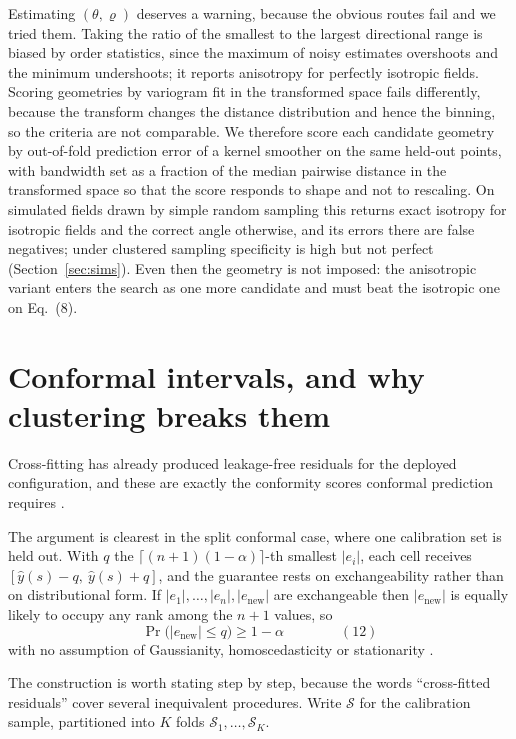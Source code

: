 \documentclass[preprint,12pt,authoryear]{elsarticle}
\newcommand{\eqnum}[1]{\qquad\qquad\mathrm{(#1)}}
\begin{document}
Estimating $(\theta,\varrho)$ deserves a warning, because the obvious routes
fail and we tried them. Taking the ratio of the smallest to the largest
directional range is biased by order statistics, since the maximum of noisy
estimates overshoots and the minimum undershoots; it reports anisotropy for
perfectly isotropic fields. Scoring geometries by variogram fit in the
transformed space fails differently, because the transform changes the distance
distribution and hence the binning, so the criteria are not comparable. We
therefore score each candidate geometry by out-of-fold prediction error of a
kernel smoother on the same held-out points, with bandwidth set as a fraction of
the median pairwise distance in the transformed space so that the score responds
to shape and not to rescaling. On simulated fields drawn by simple random
sampling this returns exact isotropy for isotropic fields and the correct angle
otherwise, and its errors there are false negatives; under clustered sampling
specificity is high but not perfect (Section~\ref{sec:sims}). Even then the geometry is not imposed: the anisotropic variant enters
the search as one more candidate and must beat the isotropic one on Eq.~(8).

\section{Conformal intervals, and why clustering breaks them}
\label{sec:intervals}

Cross-fitting has already produced leakage-free residuals for the deployed
configuration, and these are exactly the conformity scores conformal prediction
requires \citep{papadopoulos2002,vovk2005,lei2018}.

The argument is clearest in the split conformal case, where one calibration set
is held out. With $q$ the $\lceil (n+1)(1-\alpha)\rceil$-th smallest $|e_i|$,
each cell receives $[\hat y(s)-q,\ \hat y(s)+q]$, and the guarantee rests on
exchangeability rather than on distributional form. If
$|e_1|,\dots,|e_n|,|e_{\mathrm{new}}|$ are exchangeable then $|e_{\mathrm{new}}|$
is equally likely to occupy any rank among the $n+1$ values, so
\[
\Pr\big(|e_{\mathrm{new}}| \le q\big) \ge 1-\alpha
\eqnum{12}
\]
with no assumption of Gaussianity, homoscedasticity or stationarity
\citep{vovk2005}.

The construction is worth stating step by step, because the words
``cross-fitted residuals'' cover several inequivalent procedures. Write
$\mathcal{S}$ for the calibration sample, partitioned into $K$ folds
$\mathcal{S}_1,\dots,\mathcal{S}_K$.
\end{document}
